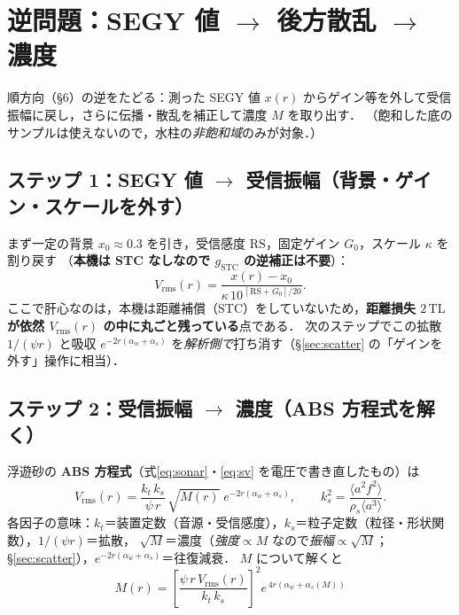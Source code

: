 \documentclass[11pt]{ltjsarticle}
\begin{document}
\section{逆問題：SEGY 値 $\to$ 後方散乱 $\to$ 濃度}
\label{sec:inverse}
順方向（\S6）の逆をたどる：測った SEGY 値 $x(r)$ からゲイン等を外して受信振幅に戻し，さらに伝播・散乱を補正して濃度 $M$ を取り出す．
（飽和した底のサンプルは使えないので，水柱の\emph{非飽和域}のみが対象．）

\subsection{ステップ 1：SEGY 値 $\to$ 受信振幅（背景・ゲイン・スケールを外す）}
まず一定の背景 $x_0\approx0.3$ を引き，受信感度 $\mathrm{RS}$，固定ゲイン $G_0$，スケール $\kappa$ を割り戻す
（\textbf{本機は STC なしなので $g_{\mathrm{STC}}$ の逆補正は不要}）：
\begin{equation}
V_{\mathrm{rms}}(r)=\frac{x(r)-x_0}{\kappa\,10^{\,[\mathrm{RS}+G_0]/20}} .
\end{equation}
ここで肝心なのは，本機は距離補償（STC）をしていないため，\textbf{距離損失 $2\,\mathrm{TL}$ が依然 $V_{\mathrm{rms}}(r)$ の中に丸ごと残っている}点である．
次のステップでこの拡散 $1/(\psi r)$ と吸収 $e^{-2r(\alpha_w+\alpha_s)}$ を\emph{解析側で}打ち消す（\S\ref{sec:scatter} の「ゲインを外す」操作に相当）．

\subsection{ステップ 2：受信振幅 $\to$ 濃度（ABS 方程式を解く）}
浮遊砂の \textbf{ABS 方程式}（式\eqref{eq:sonar}・\eqref{eq:sv} を電圧で書き直したもの）は
\begin{equation}
V_{\mathrm{rms}}(r)=\frac{k_t\,k_s}{\psi\,r}\,\sqrt{M(r)}\;e^{-2r(\alpha_w+\alpha_s)},\qquad
k_s^2=\frac{\langle a^2 f^2\rangle}{\rho_s\langle a^3\rangle}.
\end{equation}
各因子の意味：$k_t$＝装置定数（音源・受信感度），$k_s$＝粒子定数（粒径・形状関数），$1/(\psi r)$＝拡散，
$\sqrt{M}$＝濃度（\emph{強度}$\propto M$ なので\emph{振幅}$\propto\sqrt{M}$；\S\ref{sec:scatter}），$e^{-2r(\alpha_w+\alpha_s)}$＝往復減衰．
$M$ について解くと
\begin{equation}
\boxed{\;M(r)=\left[\frac{\psi\,r\,V_{\mathrm{rms}}(r)}{k_t\,k_s}\right]^2 e^{\,4r(\alpha_w+\alpha_s(M))}\;}
\label{eq:M}
\end{equation}
\end{document}
